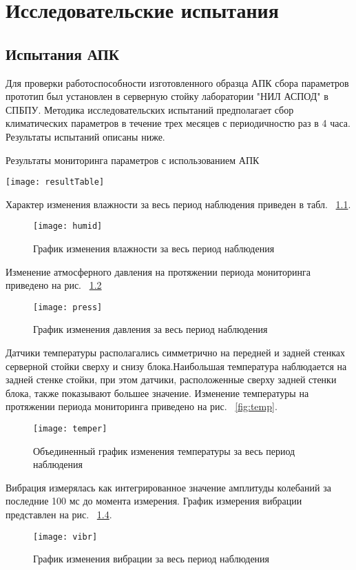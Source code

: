 
\chapter{Исследовательские испытания}


\section{Испытания АПК}
Для проверки работоспособности изготовленного образца АПК сбора параметров прототип был установлен в серверную стойку лаборатории "НИЛ АСПОД" в СПБПУ. Методика исследовательских испытаний предполагает сбор климатических параметров в течение трех месяцев с периодичностю раз в 4 часа. Результаты испытаний описаны ниже.
 
\begin{table}
	\captionsetup{skip=5pt}
	\caption{Результаты мониторинга параметров с использованием АПК}
	\centering
	\texttt{[image: resultTable]}
	\label{tab:result}
\end{table}

Характер  изменения влажности  за  весь  период  наблюдения  приведен в табл. ~\ref{fig:humid}.

\begin{figure}[h]
	\centering
	\texttt{[image: humid]}
	\caption{График изменения влажности за весь период наблюдения}
	\label{fig:humid}
\end{figure}

Изменение  атмосферного давления  на протяжении периода мониторинга приведено на рис. ~\ref{fig:press}

 \begin{figure}[h]
 	\centering
 	\texttt{[image: press]}
 	\caption{График изменения давления за весь период наблюдения}
 	\label{fig:press}
 \end{figure}

Датчики  температуры  располагались  симметрично  на  передней  и задней стенках серверной стойки сверху и снизу блока.Наибольшая  температура  наблюдается  на  задней  стенке  стойки,  при этом датчики, расположенные сверху задней стенки блока, также показывают большее  значение.  Изменение  температуры  на  протяжении  периода 
мониторинга приведено на рис. ~\ref{fig:temp}.

\begin{figure}[H]
	\centering
	\texttt{[image: temper]}
	\caption{Объединенный график изменения температуры за весь период наблюдения}
	\label{fig:temper}
\end{figure}
Вибрация  измерялась  как  интегрированное  значение  амплитуды колебаний за последние 100 мс до момента измерения. График измерения вибрации представлен на рис.  ~\ref{fig:vibr}.

\begin{figure}[!h]
	\centering
	\texttt{[image: vibr]}
	\caption{График изменения вибрации за весь период наблюдения}
	\label{fig:vibr}
\end{figure}